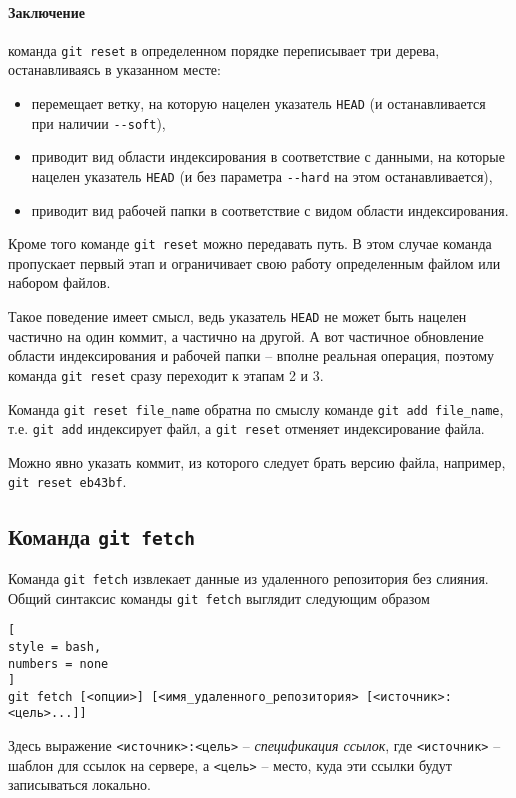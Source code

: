 \documentclass[%
	11pt,
	a4paper,
	utf8,
		]{article}
\begin{document}
\paragraph{Заключение} команда \texttt{git reset} в определенном порядке переписывает три дерева, останавливаясь в указанном месте:
\begin{itemize}
	\item перемещает ветку, на которую нацелен указатель \texttt{HEAD} (и останавливается при наличии \verb|--soft|),
	
	\item приводит вид области индексирования в соответствие с данными, на которые нацелен указатель \texttt{HEAD} (и без параметра \verb|--hard| на этом останавливается),
	
	\item приводит вид рабочей папки в соответствие с видом области индексирования.
\end{itemize}

Кроме того команде \texttt{git reset} можно передавать путь. В этом случае команда пропускает первый этап и ограничивает свою работу определенным файлом или набором файлов.

Такое поведение имеет смысл, ведь указатель \texttt{HEAD} не может быть нацелен частично на один коммит, а частично на другой. А вот частичное обновление области индексирования и рабочей папки -- вполне реальная операция, поэтому команда \texttt{git reset} сразу переходит к этапам 2 и 3.

Команда \texttt{git reset file\_name} обратна по смыслу команде \texttt{git add file\_name}, т.е. \texttt{git add} индексирует файл, а \texttt{git reset} отменяет индексирование файла.

Можно явно указать коммит, из которого следует брать версию файла, например, \texttt{git reset eb43bf}.

\subsection{Команда \texttt{git fetch}}

Команда \texttt{git fetch} извлекает данные из удаленного репозитория без слияния. Общий синтаксис команды \texttt{git fetch} выглядит следующим образом
\begin{lstlisting}[
style = bash,
numbers = none
]
git fetch [<опции>] [<имя_удаленного_репозитория> [<источник>:<цель>...]]
\end{lstlisting}

Здесь выражение \verb|<источник>:<цель>| -- \emph{спецификация ссылок}, где \verb|<источник>| -- шаблон для ссылок на сервере, а \verb|<цель>| -- место, куда эти ссылки будут записываться локально.
\end{document}
